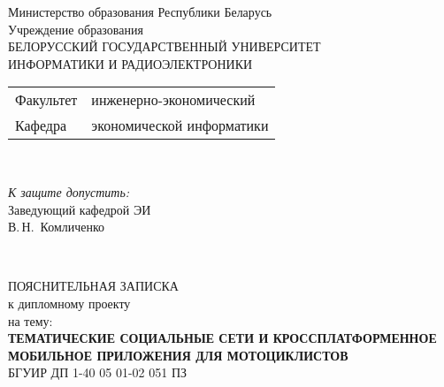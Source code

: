 \begin{titlepage}
  \begin{center}
    Министерство образования Республики Беларусь\\[1em]
    Учреждение образования\\
    БЕЛОРУССКИЙ ГОСУДАРСТВЕННЫЙ УНИВЕРСИТЕТ \\
    ИНФОРМАТИКИ И РАДИОЭЛЕКТРОНИКИ\\[1em]

    \begin{minipage}{\textwidth}
      \begin{flushleft}
        \begin{tabular}{ l l }
          Факультет & инженерно-экономический\\
          Кафедра   & экономической информатики
        \end{tabular}
      \end{flushleft}
    \end{minipage}\\[1em]

    \begin{flushright}
      \begin{minipage}{0.4\textwidth}
        \textit{К защите допустить:}\\[0.8em]
        Заведующий кафедрой ЭИ\\[0.45em]
        \underline{\hspace*{2.6cm}} В.\,Н.~Комличенко
      \end{minipage}\\[2.2em]
    \end{flushright}

    {ПОЯСНИТЕЛЬНАЯ ЗАПИСКА}\\
    {к дипломному проекту}\\
    {на тему:}\\[1em]
    \textbf{\large ТЕМАТИЧЕСКИЕ СОЦИАЛЬНЫЕ СЕТИ И КРОССПЛАТФОРМЕННОЕ МОБИЛЬНОЕ ПРИЛОЖЕНИЯ ДЛЯ МОТОЦИКЛИСТОВ}\\[1em]


    {БГУИР ДП 1-40 05 01-02 051 ПЗ}\\[2em]
    

\end{center}
\end{titlepage}
